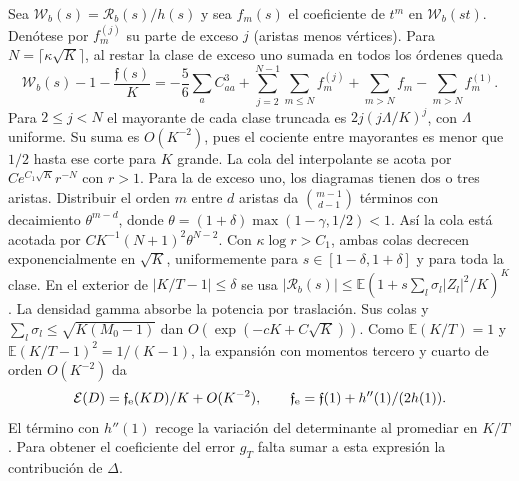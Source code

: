 Sea $\mathcal W_b(s)=\mathcal R_b(s)/h(s)$ y sea $f_m(s)$ el coeficiente de $t^m$ en $\mathcal W_b(st)$.
Denótese por $f_m^{(j)}$ su parte de exceso $j$ (aristas menos vértices). Para
$N=\lceil\kappa\sqrt K\rceil$, al restar la clase de exceso uno sumada en todos los órdenes queda
\[
 \mathcal W_b(s)-1-\frac{\mathfrak f(s)}K
 =-\frac56\sum_a C_{aa}^3+\sum_{j=2}^{N-1}\sum_{m\le N}f_m^{(j)}
   +\sum_{m>N}f_m-\sum_{m>N}f_m^{(1)} .
\]
Para $2\le j<N$ el mayorante de cada clase truncada es $2j(j\Lambda/K)^j$, con $\Lambda$
uniforme. Su suma es $O(K^{-2})$, pues el cociente entre mayorantes es menor que $1/2$
hasta ese corte para $K$ grande. La cola del interpolante se acota por $C e^{C_1\sqrt K}r^{-N}$
con $r>1$. Para la de exceso uno, los diagramas tienen dos o tres aristas. Distribuir el orden $m$
entre $d$ aristas da $\binom{m-1}{d-1}$ términos con decaimiento $\theta^{m-d}$, donde
$\theta=(1+\delta)\max(1-\gamma,1/2)<1$. Así la cola está acotada por
$C K^{-1}(N+1)^2\theta^{N-2}$. Con $\kappa\log r>C_1$, ambas colas decrecen exponencialmente
en $\sqrt K$, uniformemente para $s\in[1-\delta,1+\delta]$ y para toda la clase.
En el exterior de $|K/T-1|\le\delta$ se usa
$|\mathcal R_b(s)|\le\mathbb E(1+s\sum_l\sigma_l|Z_l|^2/K)^K$.
La densidad gamma absorbe la potencia por traslación. Sus colas y
$\sum_l\sigma_l\le\sqrt{K(M_0-1)}$ dan $O(\exp(-cK+C\sqrt K))$.
Como $\mathbb E(K/T)=1$ y $\mathbb E(K/T-1)^2=1/(K-1)$, la expansión con
momentos tercero y cuarto de orden $O(K^{-2})$ da
\[
 \mathcal E(D)=\mathfrak f_{\rm e}(KD)/K+O(K^{-2}),\qquad
 \mathfrak f_{\rm e}=\mathfrak f(1)+h''(1)/(2h(1)).
\]
El término con $h''(1)$ recoge la variación del determinante al promediar en $K/T$. Para obtener
el coeficiente del error $g_T$ falta sumar a esta expresión la contribución de $\Delta$.






